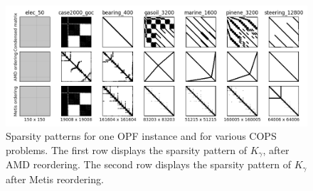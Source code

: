 \begin{figure}[!ht]
  \centering
  \includegraphics[width=.9\textwidth]{../figures/sparsity_pattern.png}
  \caption{Sparsity patterns for one OPF instance and for various
    COPS problems. The first row displays the sparsity pattern
    of $K_\gamma$, after AMD reordering. The second row displays
    the sparsity pattern of $K_\gamma$ after Metis reordering.
    \label{fig:cops:nnz}
  }
\end{figure}


